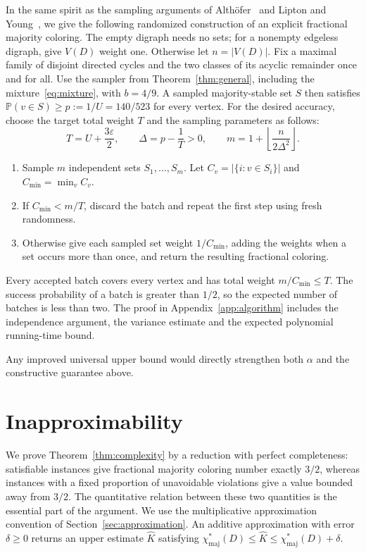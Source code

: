 \documentclass[10pt,a4paper]{article}
\newcommand{\Pp}{\mathbb P}
\newcommand{\chif}{\chi^*_{\mathrm{maj}}}
\newcommand{\abs}[1]{|#1|}
\begin{document}
In the same spirit as the sampling arguments of Alth\"ofer~\cite{Althofer} and Lipton and Young~\cite{LiptonYoung}, we give the following randomized construction of an explicit fractional majority coloring. The empty digraph needs no sets; for a nonempty edgeless digraph, give \(V(D)\) weight one. Otherwise let \(n=\abs{V(D)}\). Fix a maximal family of disjoint directed cycles and the two classes of its acyclic remainder once and for all. Use the sampler from Theorem~\ref{thm:general}, including the mixture~\eqref{eq:mixture}, with \(b=4/9\). A sampled majority-stable set \(S\) then satisfies \(\Pp(v\in S)\ge p:=1/U=140/523\) for every vertex. For the desired accuracy, choose the target total weight $T$ and the sampling parameters as follows:
\begin{equation}\label{eq:batchparameters}
T=U+\frac{3\varepsilon}{2},\qquad
\Delta=p-\frac1T>0,\qquad
m=1+\left\lfloor\frac{n}{2\Delta^2}\right\rfloor.
\end{equation}
\begin{enumerate}
\item Sample \(m\) independent sets \(S_1,\ldots,S_m\). Let \(C_v=\abs{\{i:v\in S_i\}}\) and \(C_{\min}=\min_v C_v\).
\item If \(C_{\min}<m/T\), discard the batch and repeat the first step using fresh randomness.
\item Otherwise give each sampled set weight \(1/C_{\min}\), adding the weights when a set occurs more than once, and return the resulting fractional coloring.
\end{enumerate}
Every accepted batch covers every vertex and has total weight \(m/C_{\min}\le T\). The success probability of a batch is greater than \(1/2\), so the expected number of batches is less than two. The proof in Appendix~\ref{app:algorithm} includes the independence argument, the variance estimate and the expected polynomial running-time bound.

Any improved universal upper bound would directly strengthen both \(\alpha\) and the constructive guarantee above.

\section{Inapproximability}\label{sec:complexity}
We prove Theorem~\ref{thm:complexity} by a reduction with perfect completeness: satisfiable instances give fractional majority coloring number exactly \(3/2\), whereas instances with a fixed proportion of unavoidable violations give a value bounded away from \(3/2\). The quantitative relation between these two quantities is the essential part of the argument. We use the multiplicative approximation convention of Section~\ref{sec:approximation}. An additive approximation with error \(\delta\ge0\) returns an upper estimate \(\widehat K\) satisfying \(\chif(D)\le\widehat K\le\chif(D)+\delta\).
\end{document}
